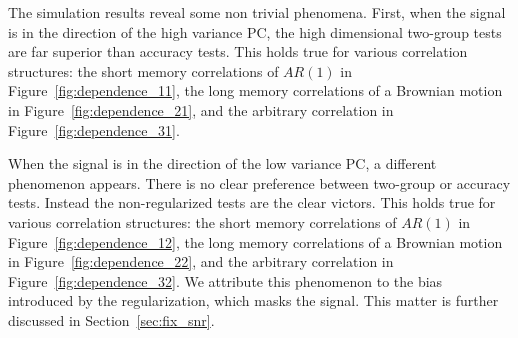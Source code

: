 \documentclass[journal]{IEEEtran}
\begin{document}
The simulation results reveal some non trivial phenomena.
First, when the signal is in the direction of the high variance PC, the high dimensional two-group tests are far superior than accuracy tests. 
This holds true for various correlation structures: the short memory correlations of $AR(1)$ in Figure~\ref{fig:dependence_11}, the long memory correlations of a Brownian motion in Figure~\ref{fig:dependence_21}, and the arbitrary correlation in Figure~\ref{fig:dependence_31}.

When the signal is in the direction of the low variance PC, a different phenomenon appears.
There is no clear preference between two-group or accuracy tests.
Instead the non-regularized tests are the clear victors. 
This holds true for various correlation structures: the short memory correlations of $AR(1)$ in Figure~\ref{fig:dependence_12}, the long memory correlations of a Brownian motion in Figure~\ref{fig:dependence_22}, and the arbitrary correlation in Figure~\ref{fig:dependence_32}.
We attribute this phenomenon to the bias introduced by the regularization, which masks the signal.
This matter is further discussed in Section~\ref{sec:fix_snr}.
\end{document}
